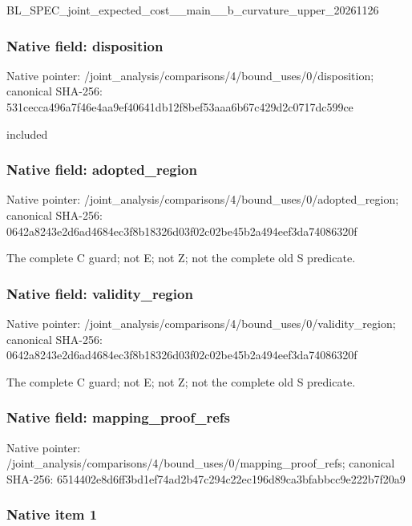 \documentclass[10pt,a4paper]{article}
\begin{document}
BL\_SPEC\_joint\_expected\_c\allowbreak{}ost\_\_main\_\_b\_curvature\_u\allowbreak{}pper\_20261126


\subsubsection{Native field: disposition}


Native pointer: /joint\_analysis/comparis\allowbreak{}ons/4/bound\_uses/0/dispo\allowbreak{}sition; canonical SHA-256: 531cecca496a7f46e4aa9ef4\allowbreak{}0641db12f8bef53aaa6b67c4\allowbreak{}29d2c0717dc599ce


included


\subsubsection{Native field: adopted\_region}


Native pointer: /joint\_analysis/comparis\allowbreak{}ons/4/bound\_uses/0/adopt\allowbreak{}ed\_region; canonical SHA-256: 0642a8243e2d6ad4684ec3f8\allowbreak{}b18326d03f02c02be45b2a49\allowbreak{}4eef3da74086320f


The complete C guard; not E; not Z; not the complete old S predicate.


\subsubsection{Native field: validity\_region}


Native pointer: /joint\_analysis/comparis\allowbreak{}ons/4/bound\_uses/0/valid\allowbreak{}ity\_region; canonical SHA-256: 0642a8243e2d6ad4684ec3f8\allowbreak{}b18326d03f02c02be45b2a49\allowbreak{}4eef3da74086320f


The complete C guard; not E; not Z; not the complete old S predicate.


\subsubsection{Native field: mapping\_proof\_refs}


Native pointer: /joint\_analysis/comparis\allowbreak{}ons/4/bound\_uses/0/mappi\allowbreak{}ng\_proof\_refs; canonical SHA-256: 6514402e8d6ff3bd1ef74ad2\allowbreak{}b47c294c22ec196d89ca3bfa\allowbreak{}bbcc9e222b7f20a9



\subsubsection{Native item 1}
\end{document}
